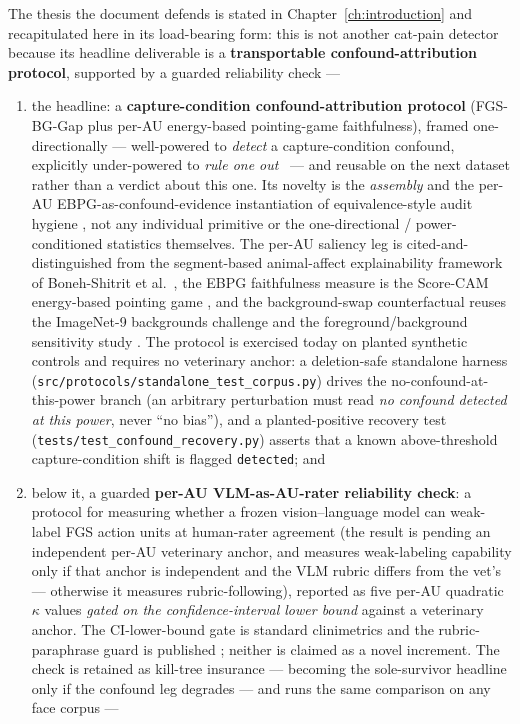 The thesis the document defends is stated in
Chapter~\ref{ch:introduction} and recapitulated here in its load-bearing form:
this is not another cat-pain detector because its headline deliverable is a
\textbf{transportable confound-attribution protocol}, supported by a guarded
reliability check ---

\begin{enumerate}
  \item the headline: a \textbf{capture-condition confound-attribution protocol}
  (FGS-BG-Gap plus per-AU energy-based pointing-game faithfulness), framed
  one-directionally --- well-powered to \emph{detect} a capture-condition confound,
  explicitly under-powered to \emph{rule one out}~\cite{adebayo2022posthoc} --- and
  reusable on the next dataset rather than a verdict about this one. Its novelty is
  the \emph{assembly} and the per-AU EBPG-as-confound-evidence instantiation of
  equivalence-style audit hygiene
  \cite{huanghooker2026fairness,singh2023samplesize}, not
  any individual primitive or the one-directional / power-conditioned statistics
  themselves. The per-AU saliency leg is cited-and-distinguished from the
  segment-based animal-affect explainability framework of
  Boneh-Shitrit et al.\ \cite{lencioni2025segment}, the EBPG faithfulness measure
  is the Score-CAM energy-based pointing game \cite{wang2020scorecam}, and the
  background-swap counterfactual reuses the ImageNet-9 backgrounds challenge and
  the foreground/background sensitivity study
  \cite{xiao2021noise,moayeri2022comprehensive}. The protocol is exercised today on
  planted synthetic controls and requires no veterinary anchor: a deletion-safe
  standalone harness (\texttt{src/protocols/standalone\_test\_corpus.py}) drives the
  no-confound-at-this-power branch (an arbitrary perturbation must read \emph{no
  confound detected at this power}, never ``no bias''), and a planted-positive
  recovery test (\texttt{tests/test\_confound\_recovery.py}) asserts that a known
  above-threshold capture-condition shift is flagged \texttt{detected}; and
  \item below it, a guarded \textbf{per-AU \mbox{VLM-as-AU-rater} reliability check}:
  a protocol for measuring whether a frozen vision--language model can weak-label FGS
  action units at human-rater agreement (the result is pending an independent per-AU
  veterinary anchor, and measures weak-labeling capability only if that anchor is
  independent and the VLM rubric differs from the vet's --- otherwise it measures
  rubric-following), reported as five per-AU quadratic $\kappa$ values
  \emph{gated on the confidence-interval lower bound} against a veterinary anchor.
  The CI-lower-bound gate is standard clinimetrics
  \cite{tractenberg2010kappa,donner2010kappa,rotondi2012kappa,rotondi2018kappasize,simwright2005kappa}
  and the rubric-paraphrase guard is published \cite{weng2026policy}; neither is
  claimed as a novel increment. The check is retained as kill-tree insurance ---
  becoming the sole-survivor headline only if the confound leg degrades --- and runs
  the same comparison on any face corpus ---
\end{enumerate}

